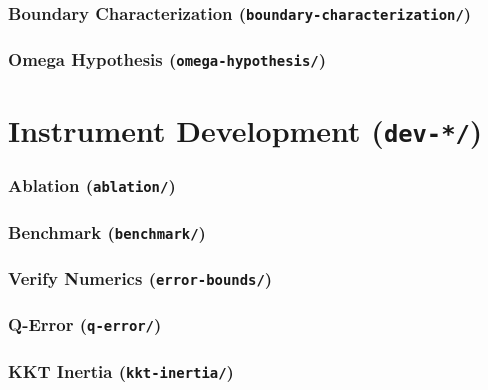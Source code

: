 \documentclass{article}
\begin{document}
\section{Boundary Characterization (\texttt{boundary-characterization/})}
\graphicspath{{exp-combinatorial-cells/boundary-characterization/}}


\section{Omega Hypothesis (\texttt{omega-hypothesis/})}
\graphicspath{{exp-combinatorial-cells/omega-hypothesis/}}


\part{Instrument Development (\texttt{dev-*/})}

\section{Ablation (\texttt{ablation/})}
\graphicspath{{dev-algorithm-comparison/ablation/}}


\section{Benchmark (\texttt{benchmark/})}
\graphicspath{{dev-algorithm-comparison/benchmark/}}


\section{Verify Numerics (\texttt{error-bounds/})}
\graphicspath{{dev-numerical-analysis/error-bounds/}}


\section{Q-Error (\texttt{q-error/})}
\graphicspath{{dev-numerical-analysis/q-error/}}


\section{KKT Inertia (\texttt{kkt-inertia/})}
\graphicspath{{dev-numerical-analysis/kkt-inertia/}}

\end{document}
